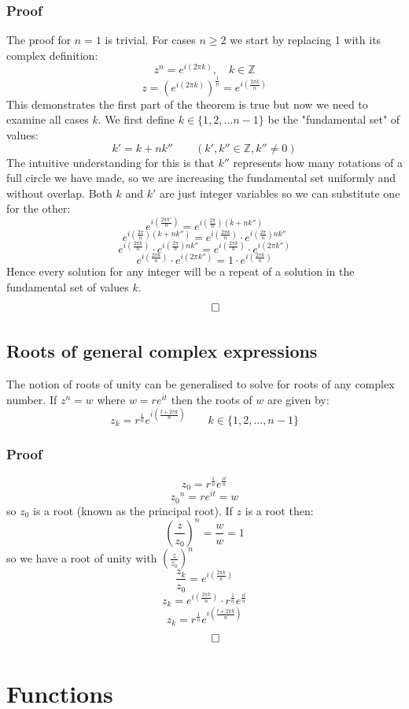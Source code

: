 \documentclass[12pt]{article}
\begin{document}
\subsubsection*{Proof}
The proof for \(n = 1\) is trivial. For cases \(n \geq 2\) we start by replacing 1 with its complex definition:
\[z^n=e^{i(2\pi k)},\quad k\in\mathbb{Z}\]
\[z=\left(e^{i(2\pi k)}\right)^\frac{1}{n}=e^{i\left(\frac{2\pi k}{n}\right)}\]
This demonstrates the first part of the theorem is true but now we need to examine all cases \(k\). We first define \(k\in\{1,2,...n-1\}\) be the "fundamental set" of values:
\[k'=k+nk''\qquad (k',k''\in\mathbb{Z},k''\ne0)\]
The intuitive understanding for this is that \(k''\) represents how many rotations of a full circle we have made, so we are increasing the fundamental set uniformly and without overlap. Both \(k\) and \(k'\) are just integer variables so we can substitute one for the other:
\[e^{i\left(\frac{2\pi k'}{n}\right)}=e^{i\left(\frac{2\pi}{n}\right)(k+nk'')}\]
\[e^{i\left(\frac{2\pi}{n}\right)(k+nk'')}=e^{i\left(\frac{2\pi k}{n}\right)}\cdot e^{i\left(\frac{2\pi}{n}\right)nk''}\]
\[e^{i\left(\frac{2\pi k}{n}\right)}\cdot e^{i\left(\frac{2\pi}{n}\right)nk''}=e^{i\left(\frac{2\pi k}{n}\right)}\cdot e^{i\left(2\pi k''\right)}\]
\[e^{i\left(\frac{2\pi k}{n}\right)}\cdot e^{i\left(2\pi k''\right)}=1\cdot e^{i\left(\frac{2\pi k}{n}\right)}\]
Hence every solution for any integer will be a repeat of a solution in the fundamental set of values \(k\).
\[\qed\]
\subsection*{Roots of general complex expressions}
The notion of roots of unity can be generalised to solve for roots of any complex number. If \(z^n=w\) where \(w=re^{it}\) then the roots of \(w\) are given by:
\[z_k=r^\frac{1}{n}e^{i\left(\frac{t+2\pi k}{n}\right)}\qquad k\in\{1,2,...,n-1\}\]
\subsubsection*{Proof}
\[z_0=r^\frac{1}{n}e^{\frac{it}{n}}\]
\[{z_0}^n=re^{it}=w\]
so \(z_0\) is a root (known as the principal root). If \(z\) is a root then:
\[\left(\frac{z}{z_0}\right)^n=\frac{w}{w}=1\]
so we have a root of unity with \(\left(\frac{z}{z_0}\right)^n\)
\[\frac{z_k}{z_0}=e^{i\left(\frac{2\pi k}{n}\right)}\]
\[z_k=e^{i\left(\frac{2\pi k}{n}\right)}\cdot r^{\frac{1}{n}}e^{\frac{it}{n}}\]
\[z_k=r^{\frac{1}{n}}e^{i\left(\frac{t+2\pi k}{n}\right)}\]
\[\qed\]
\section{Functions}
\end{document}
